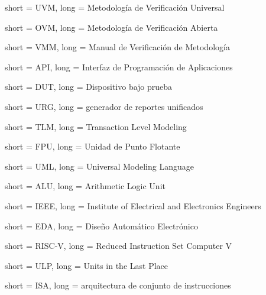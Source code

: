 

{ short = UVM, long  = Metodología de Verificación Universal }

{ short = OVM, long  = Metodología de Verificación Abierta }

{ short = VMM, long  = Manual de Verificación de Metodología}

{ short = API, long  = Interfaz de Programación de Aplicaciones }

{ short = DUT, long  = Dispositivo bajo prueba }

{ short = URG, long  = generador de reportes unificados }

{ short = TLM, long  = Transaction Level Modeling }

{ short = FPU, long  = Unidad de Punto Flotante }

{ short = UML, long  = Universal Modeling Language }

{ short = ALU, long  = Arithmetic Logic Unit }

{ short = IEEE, long  = Institute of Electrical and Electronics Engineers }

{ short = EDA, long  = Diseño Automático Electrónico }

{ short = RISC-V, long  = Reduced Instruction Set Computer V }

{ short = ULP, long  = Units in the Last Place }

{ short = ISA, long  = arquitectura de conjunto de instrucciones }